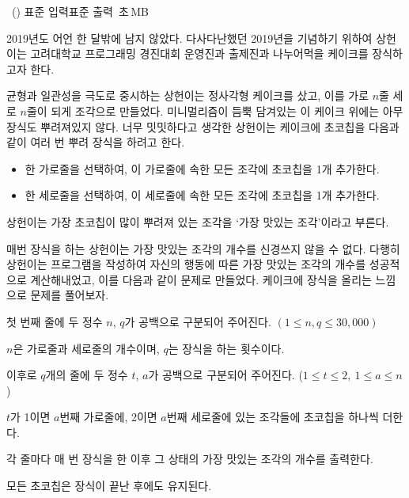 \begin{problem}{\kcpcprobcake\ (\kcpcprobcakeshort)}
    {표준 입력}{표준 출력}
    {\kcpcprobcaketime\,초}{\kcpcprobcakememory\,MB}{}
    
    2019년도 어언 한 달밖에 남지 않았다. 다사다난했던 2019년을 기념하기 위하여 상헌이는 고려대학교 프로그래밍 경진대회 운영진과 출제진과 나누어먹을 케이크를 장식하고자 한다.
    
    균형과 일관성을 극도로 중시하는 상헌이는 정사각형 케이크를 샀고, 이를 가로 $n$줄 세로 $n$줄이 되게 조각으로 만들었다. 미니멀리즘이 듬뿍 담겨있는 이 케이크 위에는 아무 장식도 뿌려져있지 않다. 너무 밋밋하다고 생각한 상헌이는 케이크에 초코칩을 다음과 같이 여러 번 뿌려 장식을 하려고 한다.
    
    \begin{itemize}
        \item 한 가로줄을 선택하여, 이 가로줄에 속한 모든 조각에 초코칩을 1개 추가한다.
        \item 한 세로줄을 선택하여, 이 세로줄에 속한 모든 조각에 초코칩을 1개 추가한다.
    \end{itemize}
    
    상헌이는 가장 초코칩이 많이 뿌려져 있는 조각을 `가장 맛있는 조각'이라고 부른다.
    
    매번 장식을 하는 상헌이는 가장 맛있는 조각의 개수를 신경쓰지 않을 수 없다. 다행히 상헌이는 프로그램을 작성하여 자신의 행동에 따른 가장 맛있는 조각의 개수를 성공적으로 계산해내었고, 이를 다음과 같이 문제로 만들었다. 케이크에 장식을 올리는 느낌으로 문제를 풀어보자.

    
    \InputFile
    첫 번째 줄에 두 정수 $n$, $q$가 공백으로 구분되어 주어진다. $(1 \leq n, q \leq 30,000)$
    
    $n$은 가로줄과 세로줄의 개수이며, $q$는 장식을 하는 횟수이다. 
    
    이후로 $q$개의 줄에 두 정수 $t$, $a$가 공백으로 구분되어 주어진다. ($1 \leq t \leq 2,\ 1 \leq a \leq n$)
    
    $t$가 1이면 $a$번째 가로줄에, 2이면 $a$번째 세로줄에 있는 조각들에 초코칩을 하나씩 더한다.
    
    \OutputFile
    각 줄마다 매 번 장식을 한 이후 그 상태의 가장 맛있는 조각의 개수를 출력한다.
    
    모든 초코칩은 장식이 끝난 후에도 유지된다.
    
    \Examples
    \begin{example}
    \end{example}
    

\end{problem}
